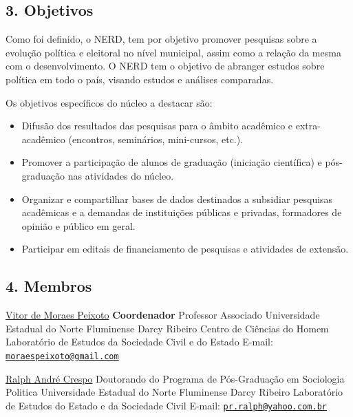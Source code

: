 \documentclass[
  12pt,
]{article}
\begin{document}
\hypertarget{objetivos}{%
\subsection{3. Objetivos}\label{objetivos}}

\hfill\break  Como foi definido, o NERD, tem por objetivo promover
pesquisas sobre a evolução política e eleitoral no nível municipal,
assim como a relação da mesma com o desenvolvimento. O NERD tem o
objetivo de abranger estudos sobre política em todo o país, visando
estudos e análises comparadas.

Os objetivos específicos do núcleo a destacar são:

\begin{itemize}
\item
  Difusão dos resultados das pesquisas para o âmbito acadêmico e
  extra-acadêmico (encontros, seminários, mini-cursos, etc.).
\item
  Promover a participação de alunos de graduação (iniciação científica)
  e pós-graduação nas atividades do núcleo.
\item
  Organizar e compartilhar bases de dados destinados a subsidiar
  pesquisas acadêmicas e a demandas de instituições públicas e privadas,
  formadores de opinião e público em geral.
\item
  Participar em editais de financiamento de pesquisas e atividades de
  extensão.
\end{itemize}

\hypertarget{membros}{%
\subsection{4. Membros}\label{membros}}

\href{http://lattes.cnpq.br/4676437210734787}{Vitor de Moraes Peixoto}
\hfill\break \textbf{Coordenador} \hfill\break Professor Associado
\hfill\break Universidade Estadual do Norte Fluminense Darcy Ribeiro
\hfill\break Centro de Ciências do Homem \hfill\break Laboratório de
Estudos da Sociedade Civil e do Estado \hfill\break E-mail:
\href{mailto:moraespeixoto@gmail.com}{\nolinkurl{moraespeixoto@gmail.com}}

\href{http://lattes.cnpq.br/7250750885312461}{Ralph André Crespo}
\hfill\break Doutorando do Programa de Pós-Graduação em Sociologia
Politica \hfill\break Universidade Estadual do Norte Fluminense Darcy
Ribeiro \hfill\break Laboratório de Estudos do Estado e da Sociedade
Civil \hfill\break E-mail:
\href{mailto:pr.ralph@yahoo.com.br}{\nolinkurl{pr.ralph@yahoo.com.br}}
\hfill\break
\end{document}
